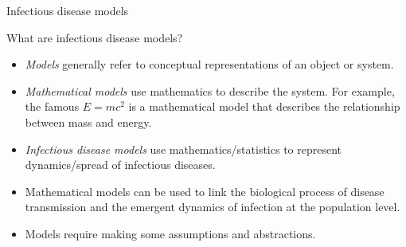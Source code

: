 \documentclass[
  ignorenonframetext,
]{beamer}
\providecommand{\tightlist}{%
  \setlength{\itemsep}{0pt}\setlength{\parskip}{0pt}}\usepackage{longtable,booktabs,array}
\begin{document}
\begin{frame}{Infectious disease models}
\label{infectious-disease-models}
\begin{block}{What are infectious disease models?}
\label{what-are-infectious-disease-models}
\begin{itemize}
\tightlist
\item
  {\emph{Models}} generally refer to conceptual representations of an
  object or system.
\item
  {\emph{Mathematical models}} use mathematics to describe the system.
  For example, the famous \(E = mc^2\) is a mathematical model that
  describes the relationship between mass and energy.
\item
  {\emph{Infectious disease models}} use mathematics/statistics to
  represent dynamics/spread of infectious diseases.
\end{itemize}
\end{block}
\end{frame}

\begin{frame}
\begin{itemize}
\tightlist
\item
  Mathematical models can be used to link the biological process of
  disease transmission and the emergent dynamics of infection at the
  population level.
\item
  Models require making some assumptions and abstractions.
\end{itemize}
\end{frame}
\end{document}
